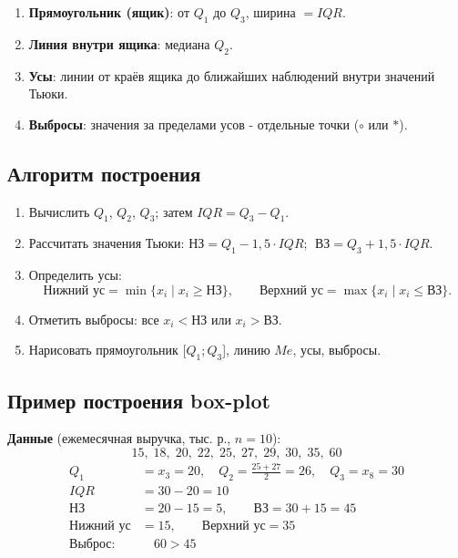 \documentclass[a4paper]{article}
\begin{document}
\begin{enumerate}
	\item \textbf{Прямоугольник (ящик)}: от $Q_1$ до $Q_3$, ширина $= IQR$.
	\item \textbf{Линия внутри ящика}: медиана $Q_2$.
	\item \textbf{Усы}: линии от краёв ящика до ближайших наблюдений внутри
	значений Тьюки.
	\item \textbf{Выбросы}: значения за пределами усов - отдельные точки
	($\circ$ или $*$).
\end{enumerate}

\subsection{Алгоритм построения}

\begin{enumerate}
	\item Вычислить $Q_1$, $Q_2$, $Q_3$; затем $IQR = Q_3 - Q_1$.
	\item Рассчитать значения Тьюки: $\text{НЗ} = Q_1 - 1{,}5\cdot IQR$;
	$\;\text{ВЗ} = Q_3 + 1{,}5\cdot IQR$.
	\item Определить усы:
	\[
	\text{Нижний ус} = \min\{x_i \mid x_i \geq \text{НЗ}\}, \qquad
	\text{Верхний ус} = \max\{x_i \mid x_i \leq \text{ВЗ}\}.
	\]
	\item Отметить выбросы: все $x_i < \text{НЗ}$ или $x_i > \text{ВЗ}$.
	\item Нарисовать прямоугольник [$Q_1$;\,$Q_3$], линию $Me$, усы, выбросы.
\end{enumerate}

\subsection{Пример построения box-plot}


	\textbf{Данные} (ежемесячная выручка, тыс. р., $n=10$):
	\[
	15,\; 18,\; 20,\; 22,\; 25,\; 27,\; 29,\; 30,\; 35,\; 60
	\]
	\begin{align*}
		Q_1 &= x_3 = 20, \quad Q_2 = \tfrac{25+27}{2} = 26, \quad Q_3 = x_8 = 30\\
		IQR &= 30 - 20 = 10 \\
		\text{НЗ} &= 20 - 15 = 5, \qquad \text{ВЗ} = 30 + 15 = 45\\
		\text{Нижний ус} &= 15, \qquad \text{Верхний ус} = 35\\
		\text{Выброс:} &\quad 60 > 45
	\end{align*}
	
\end{document}
